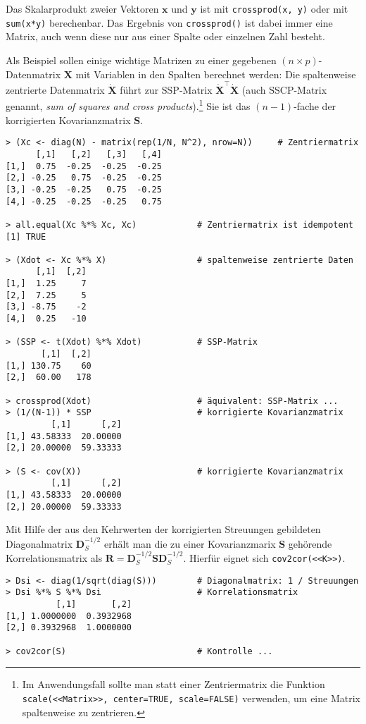 Das Skalarprodukt zweier Vektoren $\bm{x}$ und $\bm{y}$ ist mit \lstinline!crossprod(x, y)! oder mit \lstinline!sum(x*y)! berechenbar. Das Ergebnis von \lstinline!crossprod()! ist dabei immer eine Matrix, auch wenn diese nur aus einer Spalte oder einzelnen Zahl besteht.

Als Beispiel sollen einige wichtige Matrizen zu einer gegebenen $(n \times p)$-Datenmatrix $\bm{X}$ mit Variablen in den Spalten berechnet werden: Die spaltenweise zentrierte Datenmatrix $\dot{\bm{X}}$ führt zur SSP-Matrix $\dot{\bm{X}}^{\top} \dot{\bm{X}}$ (auch SSCP-Matrix genannt, \emph{sum of squares and cross products}).\footnote{Im Anwendungsfall sollte man statt einer Zentriermatrix die Funktion \lstinline!scale(<<Matrix>>, center=TRUE, scale=FALSE)! verwenden, um eine Matrix spaltenweise zu zentrieren.} Sie ist das $(n-1)$-fache der korrigierten Kovarianzmatrix $\bm{S}$.
\begin{lstlisting}
> (Xc <- diag(N) - matrix(rep(1/N, N^2), nrow=N))     # Zentriermatrix
      [,1]   [,2]   [,3]   [,4]
[1,]  0.75  -0.25  -0.25  -0.25
[2,] -0.25   0.75  -0.25  -0.25
[3,] -0.25  -0.25   0.75  -0.25
[4,] -0.25  -0.25  -0.25   0.75

> all.equal(Xc %*% Xc, Xc)            # Zentriermatrix ist idempotent
[1] TRUE

> (Xdot <- Xc %*% X)                  # spaltenweise zentrierte Daten
      [,1]  [,2]
[1,]  1.25     7
[2,]  7.25     5
[3,] -8.75    -2
[4,]  0.25   -10

> (SSP <- t(Xdot) %*% Xdot)           # SSP-Matrix
       [,1]  [,2]
[1,] 130.75    60
[2,]  60.00   178

> crossprod(Xdot)                     # äquivalent: SSP-Matrix ...
> (1/(N-1)) * SSP                     # korrigierte Kovarianzmatrix
         [,1]      [,2]
[1,] 43.58333  20.00000
[2,] 20.00000  59.33333

> (S <- cov(X))                       # korrigierte Kovarianzmatrix
         [,1]      [,2]
[1,] 43.58333  20.00000
[2,] 20.00000  59.33333
\end{lstlisting}

Mit Hilfe der aus den Kehrwerten der korrigierten Streuungen gebildeten Diagonalmatrix $\bm{D}_{S}^{-1/2}$ erhält man die zu einer Kovarianzmarix $\bm{S}$ gehörende Korrelationsmatrix als $\bm{R} = \bm{D}_{S}^{-1/2} \bm{S} \bm{D}_{S}^{-1/2}$. Hierfür eignet sich \lstinline!cov2cor(<<K>>)!.
\begin{lstlisting}
> Dsi <- diag(1/sqrt(diag(S)))        # Diagonalmatrix: 1 / Streuungen
> Dsi %*% S %*% Dsi                   # Korrelationsmatrix
          [,1]       [,2]
[1,] 1.0000000  0.3932968
[2,] 0.3932968  1.0000000

> cov2cor(S)                          # Kontrolle ...
\end{lstlisting}

